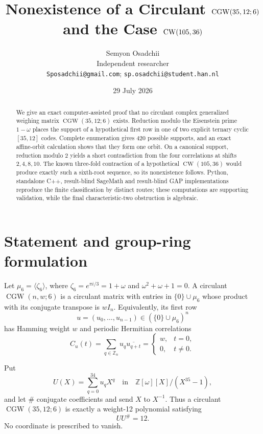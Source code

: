 \documentclass[10pt]{article}
\title{Nonexistence of a Circulant $\CGW(35,12;6)$\\
and the Case $\CW(105,36)$}
\author{Semyon Osadchii\\
\small Independent researcher\\
\small \texttt{Sposadchii@gmail.com}; \texttt{sp.osadchii@student.han.nl}}
\date{29 July 2026}
\newcommand{\Z}{\mathbb Z}
\newcommand{\CW}{\operatorname{CW}}
\newcommand{\CGW}{\operatorname{CGW}}
\begin{document}
\maketitle

\begin{abstract}
We give an exact computer-assisted proof that no circulant complex generalized
weighing matrix $\CGW(35,12;6)$ exists.  Reduction modulo the Eisenstein prime
$1-\omega$ places the support of a hypothetical first row in one of two
explicit ternary cyclic $[35,12]$ codes.  Complete enumeration gives 420
possible supports, and an exact affine-orbit calculation shows that they form
one orbit.  On a canonical support, reduction modulo $2$ yields a short
contradiction from the four correlations at shifts $2,4,8,10$.  The known
three-fold contraction of a hypothetical $\CW(105,36)$ would produce exactly
such a sixth-root sequence, so its nonexistence follows.  Python, standalone
C++, result-blind SageMath and result-blind GAP implementations reproduce the
finite classification by distinct routes; these computations are supporting
validation, while the final characteristic-two obstruction is algebraic.
\end{abstract}

\section{Statement and group-ring formulation}

Let $\mu_6=\langle\zeta_6\rangle$, where
$\zeta_6=e^{\pi i/3}=1+\omega$ and $\omega^2+\omega+1=0$.  A circulant
$\CGW(n,w;6)$ is a circulant matrix with entries in
$\{0\}\cup\mu_6$ whose product with its conjugate transpose is $wI_n$.
Equivalently, its first row
\[
 u=(u_0,\ldots,u_{n-1})\in(\{0\}\cup\mu_6)^n
\]
has Hamming weight $w$ and periodic Hermitian correlations
\[
 C_u(t)=\sum_{q\in\Z_n}u_q\overline{u_{q+t}}
 =\begin{cases}w,&t=0,\\0,&t\ne0.\end{cases}
\]

Put
\[
 U(X)=\sum_{q=0}^{34}u_qX^q
 \quad\text{in}\quad
 \Z[\omega][X]/(X^{35}-1),
\]
and let $\#$ conjugate coefficients and send $X$ to $X^{-1}$.  Thus a
circulant $\CGW(35,12;6)$ is exactly a weight-12 polynomial satisfying
\begin{equation}\label{eq:group-ring}
 UU^\#=12.
\end{equation}
No coordinate is prescribed to vanish.
\end{document}
